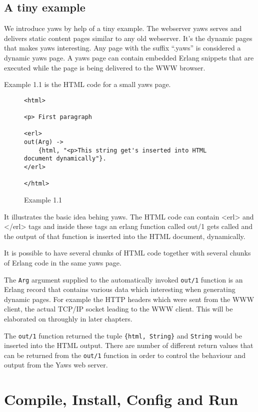 \documentclass[11pt,oneside,english]{book}
\begin{document}
\section{A tiny example}

We introduce yaws by help of a tiny example. 
 The webserver yaws serves  and delivers
static content pages similar to any old webserver. It's the dynamic pages
that makes yaws interesting. Any page with the suffix ``.yaws'' is considered
a dynamic yaws page. A yaws page can contain embedded Erlang snippets that
are executed while the page is being delivered to the WWW browser.

Example 1.1 is the HTML code for a small yaws page.


\begin{figure}[h]
\begin{verbatim}
<html>

<p> First paragraph

<erl>
out(Arg) ->
    {html, "<p>This string get's inserted into HTML document dynamically"}.
</erl>

</html>
\end{verbatim}
\caption{Example 1.1}
\end{figure}

It illustrates the basic idea behing yaws. The HTML code
can contain <erl> and </erl> tags and inside these tags an erlang function
called out/1 gets called and the output of that function is inserted
into the HTML document, dynamically. 

It is possible to have several chunks of HTML code together with several 
chunks of Erlang code in the same yaws page.

The \verb+Arg+ argument supplied to the automatically invoked \verb+out/1+
function is an Erlang record that contains various data which interesting 
when generating dynamic pages. For example the HTTP headers which were sent
from the WWW client, the actual TCP/IP socket leading to the WWW client.
This will be elaborated on throughly in later chapters. 

The \verb+out/1+ function returned the tuple \verb+{html, String}+ and 
\verb+String+ would be inserted into the HTML output. There are number
of different return values that can be returned from the \verb+out/1+ function
in order to control the behaviour and output from the Yaws web server.



\chapter{Compile, Install, Config and Run}
\end{document}
